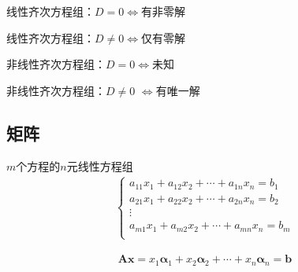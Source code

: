 \documentclass[12pt]{book}
\begin{document}
\par 线性齐次方程组：$D=0$$\Leftrightarrow $有非零解
\par 线性齐次方程组：$D\neq 0$$\Leftrightarrow $仅有零解
\par 非线性齐次方程组：$D=0$$\Leftrightarrow $未知
\par 非线性齐次方程组：$D \neq 0$ $\Leftrightarrow$有唯一解










\subsection{矩阵}




$m$个方程的$n$元线性方程组
\begin{gather*}
    \begin{cases}
       a_{11} x_{1} + a_{12} x_{2} + \cdots + a_{1n} x_{n} = b_{1} \\
       a_{21} x_{1} + a_{22} x_{2} + \cdots + a_{2n} x_{n} = b_{2} \\
       \vdots \\
       a_{m1} x_{1} + a_{m2} x_{2} + \cdots + a_{mn} x_{n} = b_{m} \\
    \end{cases}
\end{gather*}

\begin{gather*}
    \mathbf{A}\mathbf{x} = x_1\bm{\alpha}_1 +x_2\bm{\alpha}_2+\cdots + x_n\bm{\alpha}_n= \bm{b}
\end{gather*}
\end{document}

